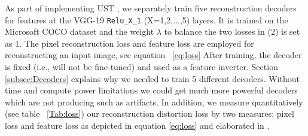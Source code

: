 As part of implementing UST \cite{bib11}, we separately train five reconstruction decoders for features
at the VGG-19 \verb|Relu_X_1| (X=1,2,...,5) layers. It is trained on the Microsoft COCO dataset \cite{bib10} and
the weight $\lambda$ to balance the two losses in (2) is set as 1.
The pixel reconstruction loss \cite{bib22} and feature loss \cite{bib22, bib17} are employed for reconstructing an input image, see equation ~\ref{eq:loss}
After training, the decoder is fixed (i.e., will not be fine-tuned) and used as a feature inverter.\newline
Section \ref{subsec:Decoders} explains why we needed to train 5 different decoders. Without time and compute power limitations we could get much more powerful decoders which are not producing such as artifacts.
In addition, we measure quantitatively (see table ~\ref{Tab:loss}) our reconstruction distortion loss by two measures: pixel loss and feature loss as depicted in equation \ref{eq:loss} and elaborated in \cite{bib22, bib17}.\newline\\


  

